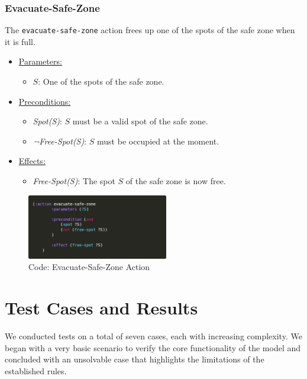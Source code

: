 \documentclass{article}
\begin{document}
\subsubsection{Evacuate-Safe-Zone}
The \texttt{evacuate-safe-zone} action frees up one of the spots of the safe zone when it is full.
\begin{itemize}
    \item \underline{Parameters:}
    \begin{itemize}
        \item $S$: One of the spots of the safe zone.
    \end{itemize}
    \item \underline{Preconditions:}
    \begin{itemize}
        \item \textit{Spot(S)}: $S$ must be a valid spot of the safe zone.
        \item \textit{¬Free-Spot(S)}: $S$ must be occupied at the moment.
    \end{itemize}
    \item \underline{Effects:}
    \begin{itemize}
        \item \textit{Free-Spot(S)}: The spot $S$ of the safe zone is now free.
    \end{itemize}
\end{itemize}
\begin{figure}[ht]
    \centering
    \includegraphics[width=0.55\textwidth]{assets/solution_coordinates/evacuate-safe-zone.png}
    \caption{Code: Evacuate-Safe-Zone Action}
    \label{fig:act:evacuate}
\end{figure}

\newpage
\section{Test Cases and Results}

We conducted tests on a total of seven cases, each with increasing complexity. We began with a very basic scenario to verify the core functionality of the model and concluded with an unsolvable case that highlights the limitations of the established rules.
\end{document}
